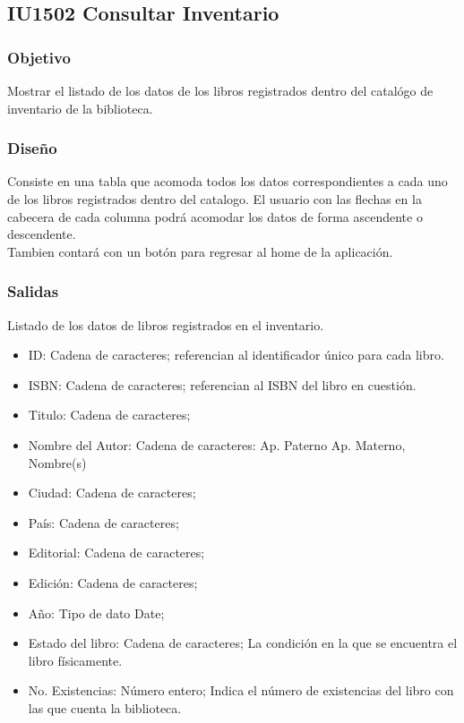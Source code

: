 \newpage
\subsection{IU1502 Consultar Inventario }

\subsubsection{Objetivo}
	Mostrar el listado de los datos de los libros registrados dentro del catalógo de inventario de la biblioteca. 

\subsubsection{Diseño}
	Consiste en una tabla que acomoda todos los datos correspondientes a cada uno de los libros registrados dentro del catalogo. El usuario con las flechas en la cabecera de cada columna podrá acomodar los datos de forma ascendente o descendente. \\
	Tambien contará con un botón para regresar al home de la aplicación. 


\subsubsection{Salidas}
	Listado de los datos de libros registrados en el inventario. 
			\begin{itemize}
				\item ID: Cadena de caracteres; referencian al identificador único para cada libro. 
				\item ISBN: Cadena de caracteres; referencian al ISBN del libro en cuestión. 
				\item Titulo: Cadena de caracteres; 
				\item Nombre del Autor: Cadena de caracteres: Ap. Paterno Ap. Materno, Nombre(s)
				\item Ciudad: Cadena de caracteres; 
				\item País: Cadena de caracteres; 
				\item Editorial: Cadena de caracteres; 
				\item Edición: Cadena de caracteres; 
				\item Año: Tipo de dato Date;
				\item Estado del libro: Cadena de caracteres; La condición en la que se encuentra el libro físicamente. 
				\item No. Existencias: Número entero; Indica el número de existencias del libro con las que cuenta la biblioteca.  
			\end{itemize}	
	
